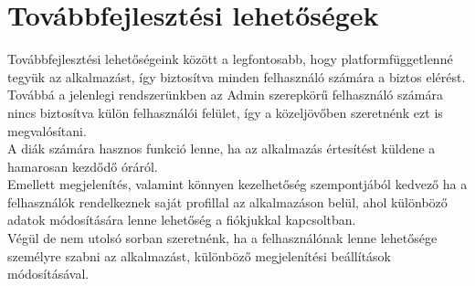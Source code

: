 \documentclass[12pt]{article}
\numberwithin{figure}{section}
\numberwithin{equation}{section}
\begin{document}
\section{Továbbfejlesztési lehetőségek}
Továbbfejlesztési lehetőségeink között a legfontosabb, hogy platformfüggetlenné tegyük az alkalmazást, így biztosítva minden felhasználó számára a biztos elérést.\\
Továbbá a jelenlegi rendszerünkben az Admin szerepkörű felhasználó számára nincs biztosítva külön felhasználói felület, így a közeljövőben szeretnénk ezt is megvalósítani.\\
A diák számára hasznos funkció lenne, ha az alkalmazás értesítést küldene a hamarosan kezdődő óráról.\\
Emellett megjelenítés, valamint könnyen kezelhetőség szempontjából kedvező ha a felhasználók rendelkeznek saját profillal az alkalmazáson belül, ahol különböző adatok módosítására lenne lehetőség a fiókjukkal kapcsoltban.\\
Végül de nem utolsó sorban szeretnénk, ha a felhasználónak lenne lehetősége személyre szabni az alkalmazást, különböző megjelenítési beállítások módosításával.

\newpage





\newpage
\end{document}
